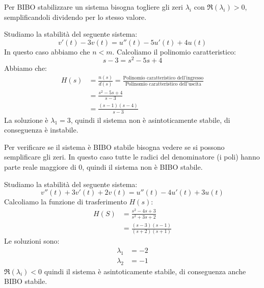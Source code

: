 \documentclass[a4paper]{article}
\begin{document}
\noindent
Per BIBO stabilizzare un sistema bisogna togliere gli zeri \( \lambda_i \) con 
\( \Re(\lambda_i) > 0 \), semplificandoli dividendo per lo stesso valore.

\begin{example}
  Studiamo la stabilità del seguente sistema:
  \[
  v'(t) - 3 v(t) = u''(t) - 5u'(t) + 4u(t)
  \] 
  In questo caso abbiamo che \( n < m \). Calcoliamo il polinomio caratteristico:
  \[
  s - 3 = s^2 - 5s + 4
  \] 
  Abbiamo che:
  \[
    \begin{aligned}
      H(s) &= \frac{n(s)}{d(s)}
            = \frac{\text{{Polinomio caratteristico dell'ingresso}}}
                   {\text{{Polinomio caratteristico dell'uscita}}}\\
           &= \frac{s^2 - 5s + 4}{s-3}\\
           &= \frac{(s-1)(s-4)}{s-3}
    \end{aligned}
  \] 
  La soluzione è \( \lambda_1 = 3 \), quindi il sistema non è asintoticamente stabile,
  di conseguenza è instabile.

  \vspace{1em}
  \noindent
  Per verificare se il sistema è BIBO stabile bisogna vedere se si possono semplificare
  gli zeri. In questo caso tutte le radici del denominatore (i poli) hanno parte reale
  maggiore di 0, quindi il sistema non è BIBO stabile.
\end{example}

\begin{example}
  Studiamo la stabilità del seguente sistema:
  \[
  v''(t) + 3v'(t) + 2v(t) = u''(t) - 4u'(t) + 3u(t)
  \] 
  Calcoliamo la funzione di trasferimento \( H(s) \):
  \[
    \begin{aligned}
      H(S) &= \frac{s^2 -4s +3}{s^2 +3s + 2}\\
           &= \frac{(s-3)(s-1)}{(s+2)(s+1)}
    \end{aligned}
  \] 
  Le soluzioni sono:
  \[
  \begin{aligned}
    \lambda_1 &= -2\\
    \lambda_2 &= -1
  \end{aligned}
  \] 
  \( \Re(\lambda_i) < 0 \) quindi il sistema è asintoticamente stabile, di conseguenza
  anche BIBO stabile.
\end{example}
\end{document}
